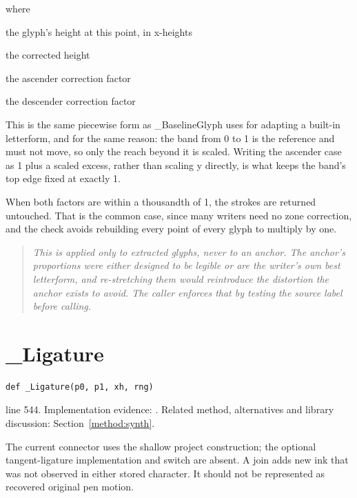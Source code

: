 \noindent where
\begin{description}[leftmargin=2.4em,style=nextline,font=\normalfont\ttfamily]\setlength\itemsep{1pt}
  \item[{$y$}] \normalfont the glyph's height at this point, in x-heights
  \item[{$y'$}] \normalfont the corrected height
  \item[{$k_{\mathrm{asc}}$}] \normalfont the ascender correction factor
  \item[{$k_{\mathrm{desc}}$}] \normalfont the descender correction factor
\end{description}
This is the same piecewise form as \_BaselineGlyph uses for adapting a built-in letterform, and for the same reason: the band from 0 to 1 is the reference and must not move, so only the reach beyond it is scaled. Writing the ascender case as 1 plus a scaled excess, rather than scaling y directly, is what keeps the band's top edge fixed at exactly 1.


When both factors are within a thousandth of 1, the strokes are returned untouched. That is the common case, since many writers need no zone correction, and the check avoids rebuilding every point of every glyph to multiply by one.


\begin{quote}\small\itshape This is applied only to extracted glyphs, never to an anchor. The anchor's proportions were either designed to be legible or are the writer's own best letterform, and re-stretching them would reintroduce the distortion the anchor exists to avoid. The caller enforces that by testing the source label before calling.\end{quote}


\section{\_Ligature}\label{fn:synthesise:-Ligature}
\begin{lstlisting}[style=sig]
def _Ligature(p0, p1, xh, rng)
\end{lstlisting}
 line 544. Implementation evidence: \cite{code2026}. Related method, alternatives and library discussion: Section~\ref{method:synth}.


The current connector uses the shallow project construction; the optional tangent-ligature implementation and switch are absent. A join adds new ink that was not observed in either stored character. It should not be represented as recovered original pen motion.



